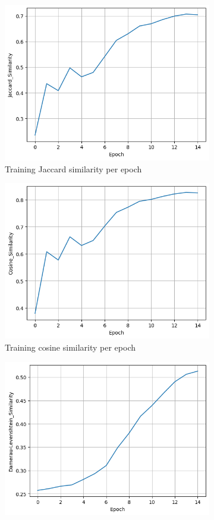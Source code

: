 \documentclass[11pt]{article}
\begin{document}
\begin{figure}[H]
\centering
\begin{subfigure}{.5\textwidth}
  \centering
  \includegraphics[width=.9\linewidth]{plots/recurrent_jaccard_similarity_per_epoch}
  \caption{Training Jaccard similarity per epoch}
\end{subfigure}%
\begin{subfigure}{.5\textwidth}
  \centering
  \includegraphics[width=.9\linewidth]{plots/recurrent_cosine_similarity_per_epoch}
  \caption{Training cosine similarity per epoch}
\end{subfigure}
\begin{subfigure}{.5\textwidth}
  \centering
  \includegraphics[width=.9\linewidth]{plots/recurrent_damerau-levenstein_similarity_per_epoch}

\end{subfigure}
\end{figure}
\end{document}

